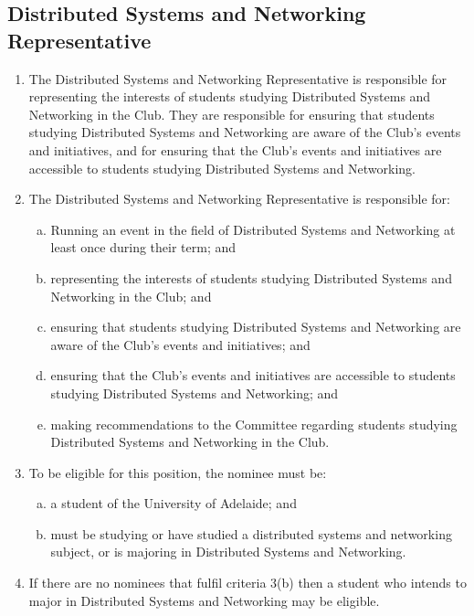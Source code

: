 \documentclass{schedule}
\begin{document}
\subsection{Distributed Systems and Networking Representative}
\begin{enumerate}[(1)]
    \item The Distributed Systems and Networking Representative is responsible for representing the interests of students studying Distributed Systems and Networking in the Club. They are responsible for ensuring that students studying Distributed Systems and Networking are aware of the Club's events and initiatives, and for ensuring that the Club's events and initiatives are accessible to students studying Distributed Systems and Networking.
    \item The Distributed Systems and Networking Representative is responsible for:
          \begin{enumerate}[(a)]
              \item Running an event in the field of Distributed Systems and Networking at least once during their term; and
              \item representing the interests of students studying Distributed Systems and Networking in the Club; and
              \item ensuring that students studying Distributed Systems and Networking are aware of the Club's events and initiatives; and
              \item ensuring that the Club's events and initiatives are accessible to students studying Distributed Systems and Networking; and
              \item making recommendations to the Committee regarding students studying Distributed Systems and Networking in the Club.
          \end{enumerate}
    \item To be eligible for this position, the nominee must be:
          \begin{enumerate}[(a)]
              \item a student of the University of Adelaide; and
              \item must be studying or have studied a distributed systems and networking subject, or is majoring in Distributed Systems and Networking.
          \end{enumerate}
    \item If there are no nominees that fulfil criteria 3(b) then a student who intends to major in Distributed Systems and Networking may be eligible.
\end{enumerate}
\end{document}
